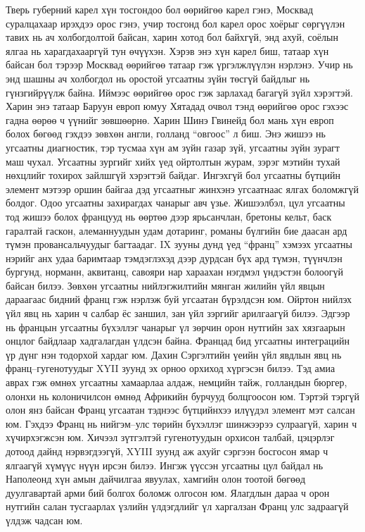 Тверь губерний карел хүн тосгондоо бол өөрийгөө карел гэнэ, Москвад суралцахаар ирэхдээ орос гэнэ, учир тосгонд бол карел орос хоёрыг сөргүүлэн тавих нь ач холбогдолтой байсан, харин хотод бол байхгүй, энд ахуй, соёлын ялгаа нь харагдахааргүй тун өчүүхэн. Хэрэв энэ хүн карел биш, татаар хүн байсан бол тэрээр Москвад өөрийгөө татаар гэж үргэлжлүүлэн нэрлэнэ. Учир нь энд шашны ач холбогдол нь оростой угсаатны зүйн төсгүй байдлыг нь гүнзгийрүүлж байна. Иймээс өөрийгөө орос гэж зарлахад багагүй зүйл хэрэгтэй. Харин энэ татаар Баруун европ юмуу Хятадад очвол тэнд өөрийгөө орос гэхээс гадна өөрөө ч үүнийг зөвшөөрнө. Харин Шинэ Гвинейд бол мань хүн европ болох бөгөөд гэхдээ зөвхөн англи, голланд “овгоос” л биш. Энэ жишээ нь угсаатны диагностик, тэр тусмаа хүн ам зүйн газар зүй, угсаатны зүйн зурагт маш чухал. Угсаатны зургийг хийх үед ойртолтын журам, зэрэг мэтийн тухай нөхцлийг тохирох зайлшгүй хэрэгтэй байдаг. Ингэхгүй бол угсаатны бүтцийн элемент мэтээр оршин байгаа дэд угсаатныг жинхэнэ угсаатнаас ялгах боломжгүй болдог.
Одоо угсаатны захирагдах чанарыг авч үзье. Жишээлбэл, цул угсаатны тод жишээ болох францууд нь өөртөө дээр ярьсанчлан, бретоны кельт, баск гаралтай гаскон, алеманнуудын удам дотаринг, романы бүлгийн бие даасан ард түмэн провансальчуудыг багтаадаг. IX зууны дунд үед “франц” хэмээх угсаатны нэрийг анх удаа баримтаар тэмдэглэхэд дээр дурдсан бүх ард түмэн, түүнчлэн бургунд, норманн, аквитанц, савояри нар хараахан нэгдмэл үндэстэн болоогүй байсан билээ. Зөвхөн угсаатны нийлэгжилтийн мянган жилийн үйл явцын дараагаас бидний франц гэж нэрлэж буй угсаатан бүрэлдсэн юм. Ойртон нийлэх үйл явц нь харин ч салбар ёс заншил, зан үйл зэргийг арилгаагүй билээ. Эдгээр нь францын угсаатны бүхэллэг чанарыг үл зөрчин орон нутгийн зах хязгаарын онцлог байдлаар хадгалагдан үлдсэн байна.
Францад бид угсаатны интеграцийн үр дүнг нэн тодорхой хардаг юм. Дахин Сэргэлтийн үеийн үйл явдлын явц нь франц–гугенотуудыг XYII зуунд эх орноо орхиход хүргэсэн билээ. Тэд амиа аврах гэж өмнөх угсаатны хамаарлаа алдаж, немцийн тайж, голландын бюргер, олонхи нь колоничилсон өмнөд Африкийн бурчууд болцгоосон юм. Тэртэй тэргүй олон янз байсан Франц угсаатан тэднээс бүтцийнхээ илүүдэл элемент мэт салсан юм. Гэхдээ Франц нь нийгэм–улс төрийн бүхэллэг шинжээрээ сулраагүй, харин ч хүчирхэгжсэн юм. Хичээл зүтгэлтэй гугенотуудын орхисон талбай, цэцэрлэг дотоод дайнд нэрвэгдээгүй, XYIII зуунд аж ахуйг сэргээн босгосон ямар ч ялгаагүй хүмүүс нүүн ирсэн билээ. Ингэж үүссэн угсаатны цул байдал нь Наполеонд хүн амын дайчилгаа явуулах, хамгийн олон тоотой бөгөөд дуулгавартай арми бий болгох боломж олгосон юм. Ялагдлын дараа ч орон нутгийн салан тусгаарлах үзлийн үлдэгдлийг үл харгалзан Франц улс задраагүй үлдэж чадсан юм.
